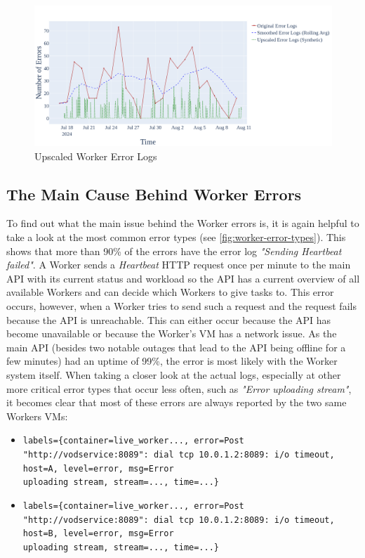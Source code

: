 \begin{figure}[htpb]
    \centering
    \includegraphics[width=\linewidth]{images/plots/worker/upscaled_error_logs.png}
    \caption[Upscaled Worker Error Logs]{Upscaled Worker Error Logs}\label{fig:worker-upscaled-error-logs}
\end{figure}

\subsection{The Main Cause Behind Worker Errors}

To find out what the main issue behind the Worker errors is, it is again helpful to take a look at the most common error types (see \autoref{fig:worker-error-types}). This shows that more than 90\% of the errors have the error log \textit{"Sending Heartbeat failed"}. A Worker sends a \textit{Heartbeat} HTTP request once per minute to the main \ac{API} with its current status and workload so the \ac{API} has a current overview of all available Workers and can decide which Workers to give tasks to. This error occurs, however, when a Worker tries to send such a request and the request fails because the \ac{API} is unreachable. This can either occur because the \ac{API} has become unavailable or because the Worker's \ac{VM} has a network issue. As the main \ac{API} (besides two notable outages that lead to the \ac{API} being offline for a few minutes) had an uptime of 99\%, the error is most likely with the Worker system itself. 
When taking a closer look at the actual logs, especially at other more critical error types that occur less often, such as \textit{"Error uploading stream"}, it becomes clear that most of these errors are always reported by the two same Workers \ac{VM}s:

\begin{itemize}
    \item \texttt{labels=\{container=live\_worker..., error=Post "http://vodservice:8089": dial tcp 10.0.1.2:8089: i/o timeout, host=A, level=error, msg=Error\\ uploading stream, stream=..., time=...\}}

    \item \texttt{labels=\{container=live\_worker..., error=Post "http://vodservice:8089": dial tcp 10.0.1.2:8089: i/o timeout, host=B, level=error, msg=Error\\ uploading stream, stream=..., time=...\}}
\end{itemize}

